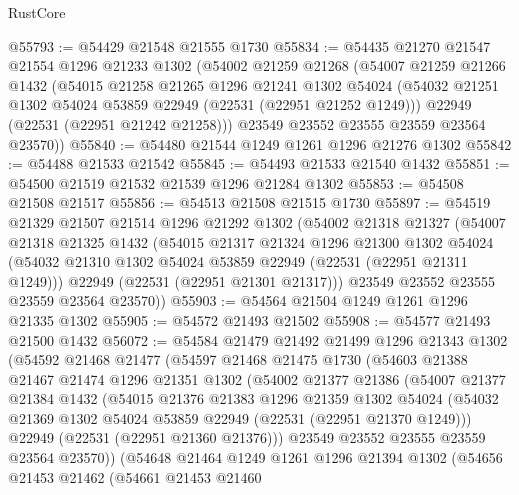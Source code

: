 \begin{lexlean}{RustCore}
\begin{coremodule}
@55793 := @54429 @21548 @21555 @1730
@55834 := @54435
    @21270
    @21547
    @21554
    @1296
    @21233
    @1302
    (@54002
      @21259
      @21268
      (@54007
        @21259
        @21266
        @1432
        (@54015
          @21258
          @21265
          @1296
          @21241
          @1302
          @54024
          (@54032 @21251 @1302 @54024 @53859 @22949 (@22531 (@22951 @21252 @1249)))
          @22949
          (@22531 (@22951 @21242 @21258)))
        @23549
        @23552
        @23555
        @23559
        @23564
        @23570))
@55840 := @54480 @21544 @1249 @1261 @1296 @21276 @1302
@55842 := @54488 @21533 @21542
@55845 := @54493 @21533 @21540 @1432
@55851 := @54500 @21519 @21532 @21539 @1296 @21284 @1302
@55853 := @54508 @21508 @21517
@55856 := @54513 @21508 @21515 @1730
@55897 := @54519
    @21329
    @21507
    @21514
    @1296
    @21292
    @1302
    (@54002
      @21318
      @21327
      (@54007
        @21318
        @21325
        @1432
        (@54015
          @21317
          @21324
          @1296
          @21300
          @1302
          @54024
          (@54032 @21310 @1302 @54024 @53859 @22949 (@22531 (@22951 @21311 @1249)))
          @22949
          (@22531 (@22951 @21301 @21317)))
        @23549
        @23552
        @23555
        @23559
        @23564
        @23570))
@55903 := @54564 @21504 @1249 @1261 @1296 @21335 @1302
@55905 := @54572 @21493 @21502
@55908 := @54577 @21493 @21500 @1432
@56072 := @54584
    @21479
    @21492
    @21499
    @1296
    @21343
    @1302
    (@54592
      @21468
      @21477
      (@54597
        @21468
        @21475
        @1730
        (@54603
          @21388
          @21467
          @21474
          @1296
          @21351
          @1302
          (@54002
            @21377
            @21386
            (@54007
              @21377
              @21384
              @1432
              (@54015
                @21376
                @21383
                @1296
                @21359
                @1302
                @54024
                (@54032 @21369 @1302 @54024 @53859 @22949 (@22531 (@22951 @21370 @1249)))
                @22949
                (@22531 (@22951 @21360 @21376)))
              @23549
              @23552
              @23555
              @23559
              @23564
              @23570))
          (@54648
            @21464
            @1249
            @1261
            @1296
            @21394
            @1302
            (@54656
              @21453
              @21462
              (@54661
                @21453
                @21460

\end{coremodule}
\end{lexlean}
